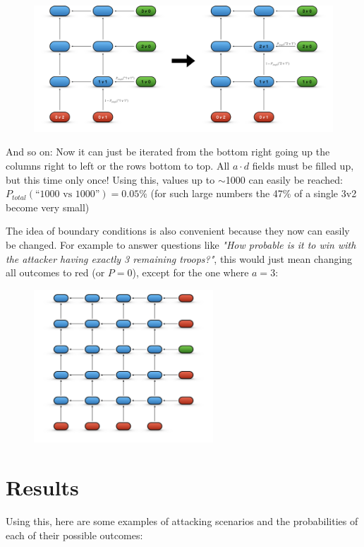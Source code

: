 \documentclass[11pt,a4paper]{article}
\begin{document}
    \begin{figure}[H]
        \centering
        \includegraphics[width=1.0\textwidth]{../images/bottom up transition.png}
    \end{figure}

    And so on: Now it can just be iterated from the bottom right going up the columns right to left or the rows bottom to top.
    All $a \cdot d$ fields must be filled up, but this time only once!
    Using this, values up to $\sim$1000 can easily be reached: $P_{total}(\text{``1000 vs 1000''}) = 0.05\%$ (for such large numbers the 47\% of a single 3v2 become very small)

    The idea of boundary conditions is also convenient because they now can easily be changed.
    For example to answer questions like \textit{"How probable is it to win with the attacker having exactly 3 remaining troops?"}, this would just mean changing all outcomes to red (or $P=0$), except for the one where $a=3$:

    \begin{figure}[H]
        \centering
        \includegraphics[width=0.6\textwidth]{../images/Boundary Conditions.png}
    \end{figure}


    \section{Results}
    Using this, here are some examples of attacking scenarios and the probabilities of each of their possible outcomes:
\end{document}
